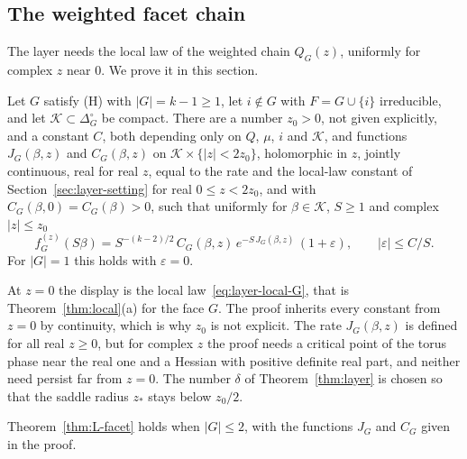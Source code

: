 \subsection{The weighted facet chain}\label{sec:layer-theorem}

The layer needs the local law of the weighted chain $Q_G(z)$, uniformly for complex $z$ near
$0$. We prove it in this section.

\begin{theorem}\label{thm:L-facet}
Let $G$ satisfy \textup{(H)} with $|G|=k-1\ge1$, let $i\notin G$ with $F=G\cup\{i\}$
irreducible, and let $\mathcal K\subset\Delta_G^\circ$ be compact. There are a number $z_0>0$,
not given explicitly, and a constant $C$, both depending only on $Q$, $\mu$, $i$ and
$\mathcal K$, and functions $J_G(\beta,z)$ and
$C_G(\beta,z)$ on $\mathcal K\times\{|z|<2z_0\}$, holomorphic in $z$, jointly continuous, real
for real $z$, equal to the rate and the local-law constant of Section~\ref{sec:layer-setting}
for real $0\le z<2z_0$, and with $C_G(\beta,0)=C_G(\beta)>0$, such that uniformly for
$\beta\in\mathcal K$, $S\ge1$ and complex $|z|\le z_0$
\begin{equation}\label{eq:L-facet}
f^{(z)}_G(S\beta)=S^{-(k-2)/2}\,C_G(\beta,z)\,e^{-S\,J_G(\beta,z)}\,(1+\varepsilon),\qquad|\varepsilon|\le C/S .
\end{equation}
For $|G|=1$ this holds with $\varepsilon=0$.
\end{theorem}

At $z=0$ the display is the local law~\eqref{eq:layer-local-G}, that is
Theorem~\ref{thm:local}(a) for the face $G$. The proof inherits every constant from $z=0$ by
continuity, which is why $z_0$ is not explicit. The rate $J_G(\beta,z)$ is defined for all real
$z\ge0$, but for complex $z$ the proof needs a critical point of the torus phase near the real
one and a Hessian with positive definite real part, and neither need persist far from $z=0$.
The number $\delta$ of Theorem~\ref{thm:layer} is chosen so that the saddle radius
$z_*$ stays below $z_0/2$.

\begin{lemma}\label{lem:L-two}
Theorem~\ref{thm:L-facet} holds when $|G|\le2$, with the functions $J_G$ and $C_G$ given in the
proof.
\end{lemma}


